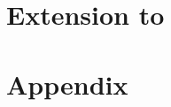 \documentclass[12pt]{article}
\begin{document}
%

\section{Extension to \citet{iyengar2012affect} }









\thispagestyle{empty}
\clearpage
{}

\section{Appendix}
\end{document}
